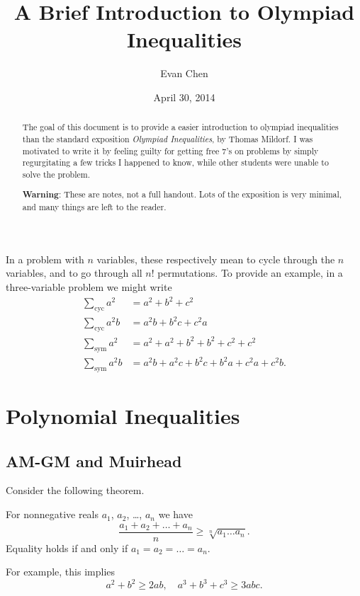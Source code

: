 \documentclass[11pt]{scrartcl}
\begin{document}
\title{A Brief Introduction to Olympiad Inequalities}
\author{Evan Chen}
\date{April 30, 2014}
\maketitle

\begin{abstract}
	The goal of this document is to provide a easier introduction to olympiad inequalities than the standard exposition \emph{Olympiad Inequalities}, by Thomas Mildorf. I was motivated to write it by feeling guilty for getting free $7$'s on problems by simply regurgitating a few tricks I happened to know, while other students were unable to solve the problem.	

	\textbf{Warning}: These are notes, not a full handout.
	Lots of the exposition is very minimal, and many things are left to the reader.
\end{abstract}

 In a problem with $n$ variables, these respectively mean to cycle through the $n$ variables, and to go through all $n!$ permutations. To provide an example, in a three-variable problem we might write
\begin{align*}
	\sum_{\text{cyc}} a^2 &= a^2+b^2+c^2 \\
	\sum_{\text{cyc}} a^2b &= a^2b+b^2c+c^2a \\
	\sum_{\text{sym}} a^2 &= a^2+a^2+b^2+b^2+c^2+c^2 \\
	\sum_{\text{sym}} a^2b &= a^2b+a^2c+b^2c+b^2a+c^2a+c^2b.
\end{align*}

\section{Polynomial Inequalities}
\subsection{AM-GM and Muirhead}
Consider the following theorem.
\begin{theorem}
	[AM-GM] For nonnegative reals $a_1$, $a_2$, \dots, $a_n$ we have
	\[ \frac{a_1 + a_2 + \dots + a_n}{n} \ge \sqrt[n]{a_1 \dots a_n}. \]
	Equality holds if and only if $a_1 = a_2 = \dots = a_n$.
\end{theorem}
For example, this implies \[ a^2+b^2 \ge 2ab, \quad a^3+b^3+c^3 \ge 3abc. \]
\end{document}
